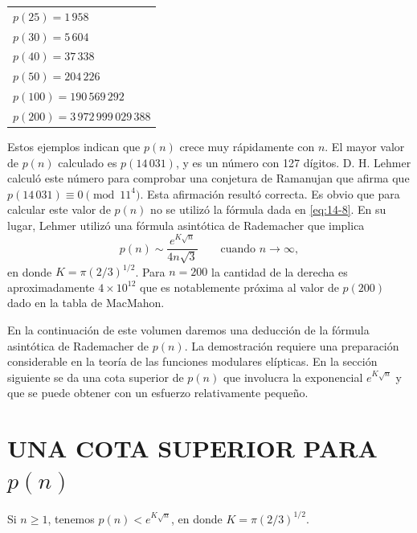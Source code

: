     \begin{center}
        \begin{tabular}{@{}l@{}}
            $p(25)=1\,958$\\
            $p(30)=5\,604$\\
            $p(40)=37\,338$\\
            $p(50)=204\,226$\\
            $p(100)=190\,569\,292$\\
            $p(200)=3\,972\,999\,029\,388$
        \end{tabular}
    \end{center}

    Estos ejemplos indican que $p(n)$ crece muy rápidamente con $n$. El mayor valor de $p(n)$
    calculado es $p(14\,031)$, y es un número con 127 dígitos. D. H. Lehmer
    \cite{lehmer1936} calculó este número para comprobar una conjetura de Ramanujan que afirma
    que $p(14\,031)\equiv0\pmod{11^4}$. Esta afirmación resultó correcta. Es obvio que para
    calcular este valor de $p(n)$ no se utilizó la fórmula dada en \eqref{eq:14-8}. En su lugar,
    Lehmer utilizó una fórmula asintótica de Rademacher \cite{rademacher1937} que implica
    \begin{equation*}
        p(n)\sim\frac{e^{K\sqrt{n}}}{4n\sqrt{3}}\qquad\text{cuando }n\to\infty,
    \end{equation*}
    en donde $K=\pi(2/3)^{1/2}$. Para $n=200$ la cantidad de la derecha es aproximadamente
    $4\times10^{12}$ que es notablemente próxima al valor de $p(200)$ dado en la tabla de
    MacMahon.

    En la continuación de este volumen daremos una deducción de la fórmula asintótica de
    Rademacher de $p(n)$. La demostración requiere una preparación considerable en la teoría de
    las funciones modulares elípticas. En la sección siguiente se da una cota superior de $p(n)$
    que involucra la exponencial $e^{K\sqrt{n}}$ y que se puede obtener con un esfuerzo
    relativamente pequeño.

    \section[UNA COTA SUPERIOR PARA $p(n)$]{UNA COTA SUPERIOR PARA \texorpdfstring{$p(n)$}{p(n)}}

    \begin{teorema}\label{teo:14-5}
        Si $n\geq1$, tenemos $p(n)<e^{K\sqrt{n}}$, en donde $K=\pi(2/3)^{1/2}$.
    \end{teorema}

